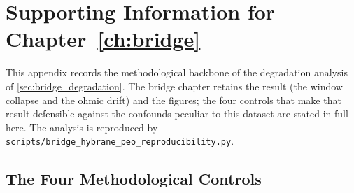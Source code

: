 
\chapter{Supporting Information for Chapter~\ref*{ch:bridge}}\label{app:ch3_si}

This appendix records the methodological backbone of the degradation analysis of
\cref{sec:bridge_degradation}. The bridge chapter retains the result (the
window collapse and the ohmic drift) and the figures; the four controls that
make that result defensible against the confounds peculiar to this dataset are
stated in full here. The analysis is reproduced by
\texttt{scripts/\allowbreak bridge\_\allowbreak hybrane\_\allowbreak peo\_\allowbreak reproducibility.py}.

\section{The Four Methodological Controls}\label{app:ch3_controls}

